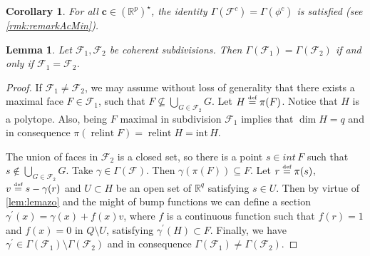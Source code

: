 \documentclass[10pt,a4paper]{article}
\DeclareMathOperator{\relint}{relint}
\def\defs{\stackrel{\tiny{\mbox{def}}}{=}}		%
\newcommand{\RR}{\mathbb{R}}
\theoremstyle{plain}
\newtheorem{lemma}{Lemma}
\newtheorem{corollary}{Corollary}
\theoremstyle{remark}
\theoremstyle{definition}
\begin{document}
\begin{corollary}
    \label{cor:gammaEquality}
    For all $\bm{c}\in(\RR^p)^\star$, the identity $\Gamma(\mathcal{F}^c) = \Gamma(\phi^c)$ is satisfied 
    (see \cref{rmk:remarkAcMin}).
\end{corollary}

\begin{lemma} 
	\label{lmm:isoInjective}
	Let $\mathcal{F}_1,\mathcal{F}_2$ be coherent subdivisions. Then $\Gamma(\mathcal{F}_1)=\Gamma(\mathcal{F}_2)$ if and only if $\mathcal{F}_1=\mathcal{F}_2$.
\end{lemma}
\begin{proof} 
	If $\mathcal{F}_1\neq \mathcal{F}_2$, 
    we may assume without loss of generality 
    that there exists a maximal face $F\in \mathcal{F}_1$, 
    such that 
    $F\nsubseteq \bigcup\limits_{G\in \mathcal{F}_2} G$. 
    Let $H\defs \pi(F)$. 
    Notice that $H$ is a polytope.
    Also, being $F$ maximal in subdivision $\mathcal{F}_1$
    implies that $\dim H=q$ 
    and in consequence $\pi( \relint F)=\relint H= \mathrm{int} \, H$.
    
    The union of faces in  $\mathcal{F}_2$ is a closed set, 
    so there is a point $s\in int \, F$ such that 
    $s\notin \bigcup\limits_{G\in \mathcal{F}_2} G$.
    Take $\gamma\in \Gamma(\mathcal{F})$. 
    Then $\gamma(\pi(F))\subseteq F$.
    Let $r\defs \pi(s)$, 
    $v\defs s-\gamma(r)$ and 
    $U\subset H$ be an open set of $\RR^q$ 
    satisfying $s\in U$.
    Then by virtue of \cref{lem:lemazo} 
    and the might of bump functions 
    we can define a section 
    $\gamma^\prime(x)=\gamma(x) + f(x)v$, 
    where $f$ is a continuous function such that $f(r)=1$ and
    $f(x)=0$ in $Q\setminus U$, 
    satisfying $\gamma^\prime(H)\subset F$.
    Finally, we have 
    $\gamma^\prime \in
    \Gamma(\mathcal{F}_1)\setminus\Gamma(\mathcal{F}_2)$ 
    and in consequence 
    $\Gamma(\mathcal{F}_1)\neq \Gamma(\mathcal{F}_2)$. 
\end{proof}
\end{document}
